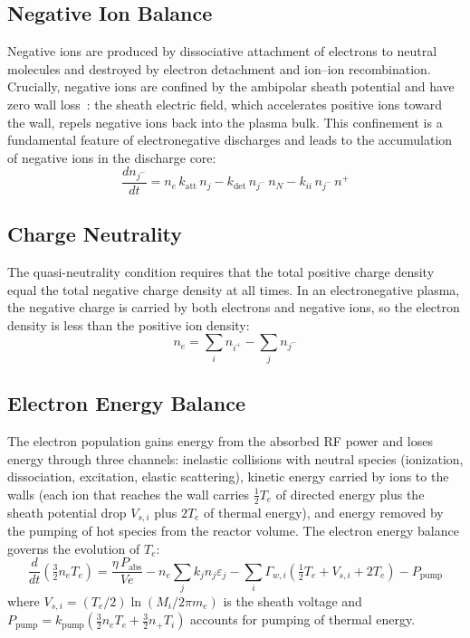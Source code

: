 \documentclass[11pt,a4paper]{report}
\newcommand{\Te}{T_e}
\begin{document}
\subsection{Negative Ion Balance}
\label{sec:pure_neg_ion}

Negative ions are produced by dissociative attachment of electrons to neutral molecules and destroyed by electron detachment and ion--ion recombination.  Crucially, negative ions are confined by the ambipolar sheath potential and have zero wall loss~\cite{Lieberman2005}: the sheath electric field, which accelerates positive ions toward the wall, repels negative ions back into the plasma bulk.  This confinement is a fundamental feature of electronegative discharges and leads to the accumulation of negative ions in the discharge core:
\begin{equation}
\boxed{\frac{dn_{j^-}}{dt} = n_e\,k_\text{att}\,n_j - k_\text{det}\,n_{j^-}\,n_N - k_{ii}\,n_{j^-}\,n^+}
\label{eq:pure_negion}
\end{equation}

\subsection{Charge Neutrality}
\label{sec:pure_charge}

The quasi-neutrality condition requires that the total positive charge density equal the total negative charge density at all times.  In an electronegative plasma, the negative charge is carried by both electrons and negative ions, so the electron density is less than the positive ion density:
\begin{equation}
\boxed{n_e = \sum_i n_{i^+} - \sum_j n_{j^-}}
\label{eq:pure_charge}
\end{equation}

\subsection{Electron Energy Balance}
\label{sec:pure_energy}

The electron population gains energy from the absorbed RF power and loses energy through three channels: inelastic collisions with neutral species (ionization, dissociation, excitation, elastic scattering), kinetic energy carried by ions to the walls (each ion that reaches the wall carries $\frac{1}{2}\Te$ of directed energy plus the sheath potential drop $V_{s,i}$ plus $2\Te$ of thermal energy), and energy removed by the pumping of hot species from the reactor volume.  The electron energy balance governs the evolution of $\Te$:
\begin{equation}
\boxed{\frac{d}{dt}\!\left(\tfrac{3}{2}n_e \Te\right) = \frac{\eta\,P_\text{abs}}{Ve} - n_e\sum_j k_j n_j \varepsilon_j - \sum_i \Gamma_{w,i}\!\left(\tfrac{1}{2}\Te + V_{s,i} + 2\Te\right) - P_\text{pump}}
\label{eq:pure_energy}
\end{equation}
where $V_{s,i} = (\Te/2)\ln(M_i/2\pi m_e)$ is the sheath voltage and $P_\text{pump} = k_\text{pump}(\frac{3}{2}n_e \Te + \frac{3}{2}n_+T_i)$ accounts for pumping of thermal energy.
\end{document}
